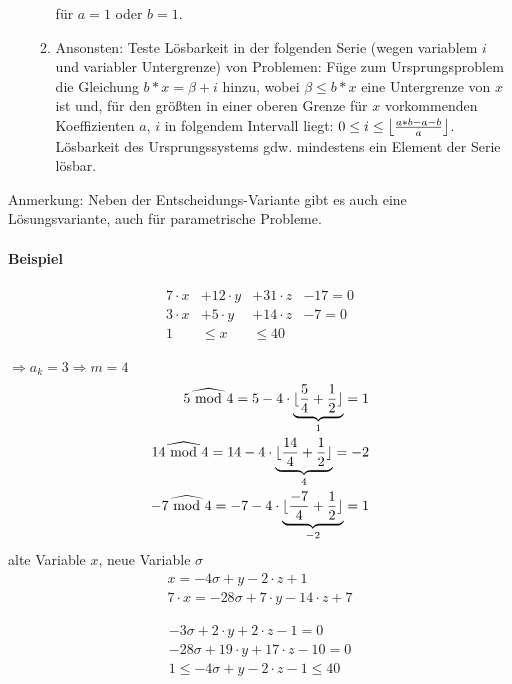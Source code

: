 \begin{enumerate}
\begin{enumerate}
    für $a=1$ oder $b=1$.
  \item Ansonsten: Teste Lösbarkeit in der folgenden Serie (wegen
    variablem $i$ und variabler Untergrenze) von Problemen: Füge zum
    Ursprungsproblem die Gleichung $b*x=\beta + i$ hinzu, wobei
    $\beta\leq b*x$ eine Untergrenze von $x$ ist und, für den
    größten in einer oberen Grenze für $x$ vorkommenden Koeffizienten
    $a$, $i$ in folgendem Intervall liegt: $0\leq i\leq
    \left\lfloor{a*b-a-b\over a}\right\rfloor$.  Lösbarkeit des
    Ursprungssystems gdw. mindestens ein Element der Serie lösbar.
  \end{enumerate}
\end{enumerate}



Anmerkung: Neben der Entscheidungs-Variante gibt es auch eine
Lösungsvariante, auch für parametrische Probleme.

\paragraph{Beispiel}

\begin{align}
7 \cdot x &+ 12 \cdot y &+ 31 \cdot z  &-17 = 0\\
3 \cdot x &+ 5 \cdot y &+ 14 \cdot z &- 7 = 0\\
1 &\leq x &\leq 40
\end{align}

\( \Rightarrow a_k = 3 \Rightarrow m = 4\) \\
\[
\begin{split}
 5 \widehat{\textrm{\ mod\ }} 4 = 5-4 \cdot \underbrace{\lfloor \frac{5}{4} + \frac{1}{2} \rfloor}_{1} = 1 \\
  14 \widehat{\textrm{\ mod\ }} 4 = 14-4 \cdot \underbrace{\lfloor \frac{14}{4} + \frac{1}{2} \rfloor}_{4} = -2 \\
   -7 \widehat{\textrm{\ mod\ }} 4 = -7-4 \cdot \underbrace{ \lfloor \frac{-7}{4} + \frac{1}{2} \rfloor }_{-2}= 1
\end{split}
\]
alte Variable \(x\), neue Variable \( \sigma \) \\

\[
\begin{split}
 x = -4 \sigma + y - 2 \cdot z + 1 \\
  7\cdot x = -28 \sigma + 7 \cdot y - 14 \cdot z + 7
\end{split}
\]

\begin{align}
 -3 \sigma +2 \cdot y + 2  \cdot z -1 = 0 \\
 -28 \sigma + 19 \cdot y + 17 \cdot z - 10 = 0 \\
 1 \leq - 4 \sigma + y - 2 \cdot z - 1 \leq 40
\end{align}


